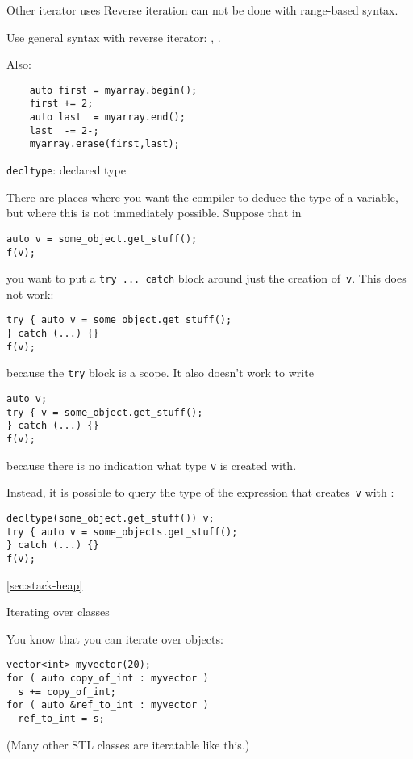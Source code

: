 \begin{block}{Other iterator uses}
  \label{sl:reverse-iterator}
  Reverse iteration can not be done with range-based syntax.
  
  Use general syntax with reverse iterator: ,
  .

  Also:
  \begin{lstlisting}
    auto first = myarray.begin();
    first += 2;
    auto last  = myarray.end();
    last  -= 2-;
    myarray.erase(first,last);
  \end{lstlisting}
\end{block}

 {\texttt{decltype}: declared type}

There are places where you want the compiler to deduce the type of a
variable, but where this is not immediately possible. Suppose that in
\begin{lstlisting}
auto v = some_object.get_stuff();
f(v);
\end{lstlisting}
you want to put a \lstinline{try ... catch} block around just the
creation of~\lstinline{v}. This does not work:
\begin{lstlisting}
try { auto v = some_object.get_stuff(); 
} catch (...) {}
f(v);
\end{lstlisting}
because the \lstinline{try} block is a scope. It also doesn't work to write
\begin{lstlisting}
auto v;
try { v = some_object.get_stuff(); 
} catch (...) {}
f(v);
\end{lstlisting}
because there is no indication what type \lstinline{v} is created
with.

Instead, it is possible to query the type of the expression that
creates~\lstinline{v} with :
\begin{lstlisting}
decltype(some_object.get_stuff()) v;
try { auto v = some_objects.get_stuff(); 
} catch (...) {}
f(v);
\end{lstlisting}



\ref{sec:stack-heap}

 {Iterating over classes}
\label{sec:range-iter}

You know that you can iterate over  objects:
\begin{lstlisting}
vector<int> myvector(20);
for ( auto copy_of_int : myvector )
  s += copy_of_int;
for ( auto &ref_to_int : myvector )
  ref_to_int = s;
\end{lstlisting}
(Many other \ac{STL} classes are iteratable like this.)

